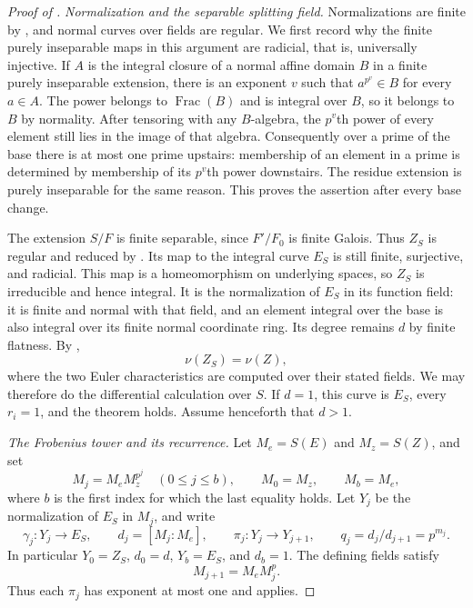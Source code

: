 \begin{proof}[Proof of ]
\textit{Normalization and the separable splitting field.}
Normalizations are finite by , and normal
curves over fields are regular.  We first record why the finite purely
inseparable maps in this argument are radicial, that is, universally
injective.  If $A$ is the integral closure of a normal affine domain
$B$ in a finite purely inseparable extension, there is an exponent $v$
such that $a^{p^v}\in B$ for every $a\in A$.  The power belongs to
$\operatorname{Frac}(B)$ and is integral over $B$, so it belongs to $B$
by normality.  After tensoring with any $B$-algebra, the $p^v$th power
of every element still lies in the image of that algebra.  Consequently
over a prime of the base there is at most one prime upstairs: membership
of an element in a prime is determined by membership of its $p^v$th
power downstairs.  The residue extension is purely inseparable for
the same reason.  This proves the assertion after every base change.

The extension $S/F$ is finite separable, since $F'/F_0$ is finite
Galois.  Thus $Z_S$ is regular and reduced by
.  Its map to the integral curve $E_S$ is
still finite, surjective, and radicial.  This map is a homeomorphism
on underlying spaces, so $Z_S$ is irreducible and hence integral.
It is the normalization of $E_S$ in its function field: it is finite
and normal with that field, and an element integral over the base is
also integral over its finite normal coordinate ring.  Its degree
remains $d$ by finite flatness.  By ,
\[
 \nu(Z_S)=\nu(Z),
\]
where the two Euler characteristics are computed over their stated
fields.  We may therefore do the differential calculation over $S$.
If $d=1$, this curve is $E_S$, every $r_i=1$, and the theorem holds.
Assume henceforth that $d>1$.

\textit{The Frobenius tower and its recurrence.}
Let $M_e=S(E)$ and $M_z=S(Z)$, and set
\[
 M_j=M_eM_z^{p^j}\quad(0\le j\le b),\qquad
 M_0=M_z,\qquad M_b=M_e,
\]
where $b$ is the first index for which the last equality holds.
Let $Y_j$ be the normalization of $E_S$ in $M_j$, and write
\[
 \gamma_j:Y_j\longrightarrow E_S,\qquad
 d_j=[M_j:M_e],\qquad
 \pi_j:Y_j\longrightarrow Y_{j+1},\qquad
 q_j=d_j/d_{j+1}=p^{m_j}.
\]
In particular $Y_0=Z_S$, $d_0=d$, $Y_b=E_S$, and $d_b=1$.
The defining fields satisfy
\begin{equation}
 M_{j+1}=M_eM_j^p.
 \label{eq:frobenius-tower-field}
\end{equation}
Thus each $\pi_j$ has exponent at most one and
 applies.


\end{proof}
